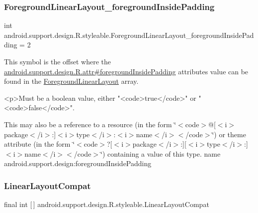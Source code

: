 \subsubsection{\texorpdfstring{Foreground\+Linear\+Layout\+\_\+foreground\+Inside\+Padding}{ForegroundLinearLayout\_foregroundInsidePadding}}
{\footnotesize\ttfamily int android.\+support.\+design.\+R.\+styleable.\+Foreground\+Linear\+Layout\+\_\+foreground\+Inside\+Padding = 2\hspace{0.3cm}{\ttfamily [static]}}

This symbol is the offset where the \hyperlink{classandroid_1_1support_1_1design_1_1R_1_1attr_afbf955c1dce92071aaf0b595e0083cb5}{android.\+support.\+design.\+R.\+attr\#foreground\+Inside\+Padding} attribute\textquotesingle{}s value can be found in the \hyperlink{classandroid_1_1support_1_1design_1_1R_1_1styleable_a423286315758e65de84a49f81984f19a}{Foreground\+Linear\+Layout} array.

\begin{DoxyVerb}      <p>Must be a boolean value, either "<code>true</code>" or "<code>false</code>".
\end{DoxyVerb}
 

This may also be a reference to a resource (in the form \char`\"{}$<$code$>$@\mbox{[}$<$i$>$package$<$/i$>$\+:\mbox{]}$<$i$>$type$<$/i$>$\+:$<$i$>$name$<$/i$>$$<$/code$>$\char`\"{}) or theme attribute (in the form \char`\"{}$<$code$>$?\mbox{[}$<$i$>$package$<$/i$>$\+:\mbox{]}\mbox{[}$<$i$>$type$<$/i$>$\+:\mbox{]}$<$i$>$name$<$/i$>$$<$/code$>$\char`\"{}) containing a value of this type.  name android.\+support.\+design\+:foreground\+Inside\+Padding \mbox{\label{classandroid_1_1support_1_1design_1_1R_1_1styleable_a00b7e2da5bc1f659d80ac76716119713}} 
\subsubsection{\texorpdfstring{Linear\+Layout\+Compat}{LinearLayoutCompat}}
{\footnotesize\ttfamily final int \mbox{[}$\,$\mbox{]} android.\+support.\+design.\+R.\+styleable.\+Linear\+Layout\+Compat\hspace{0.3cm}{\ttfamily [static]}}

